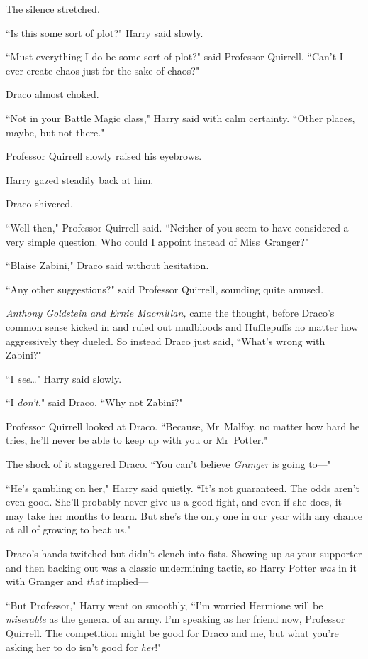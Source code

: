 The silence stretched.

``Is this some sort of plot?" Harry said slowly.

``Must everything I do be some sort of plot?" said Professor Quirrell. ``Can't I ever create chaos just for the sake of chaos?"

Draco almost choked.

``Not in your Battle Magic class," Harry said with calm certainty. ``Other places, maybe, but not there."

Professor Quirrell slowly raised his eyebrows.

Harry gazed steadily back at him.

Draco shivered.

``Well then," Professor Quirrell said. ``Neither of you seem to have considered a very simple question. Who could I appoint instead of Miss~Granger?"

``Blaise Zabini," Draco said without hesitation.

``Any other suggestions?" said Professor Quirrell, sounding quite amused.

\emph{Anthony Goldstein and Ernie Macmillan,} came the thought, before Draco's common sense kicked in and ruled out mudbloods and Hufflepuffs no matter how aggressively they dueled. So instead Draco just said, ``What's wrong with Zabini?"

``I \emph{see}{\ldots}" Harry said slowly.

``I \emph{don't}," said Draco. ``Why not Zabini?"

Professor Quirrell looked at Draco. ``Because, Mr~Malfoy, no matter how hard he tries, he'll never be able to keep up with you or Mr~Potter."

The shock of it staggered Draco. ``You can't believe \emph{Granger} is going to—"

``He's gambling on her," Harry said quietly. ``It's not guaranteed. The odds aren't even good. She'll probably never give us a good fight, and even if she does, it may take her months to learn. But she's the only one in our year with any chance at all of growing to beat us."

Draco's hands twitched but didn't clench into fists. Showing up as your supporter and then backing out was a classic undermining tactic, so Harry Potter \emph{was} in it with Granger and \emph{that} implied—

``But Professor," Harry went on smoothly, ``I'm worried Hermione will be \emph{miserable} as the general of an army. I'm speaking as her friend now, Professor Quirrell. The competition might be good for Draco and me, but what you're asking her to do isn't good for \emph{her}!"

